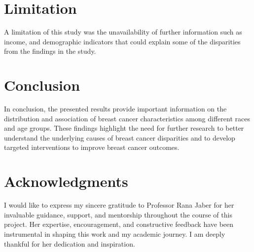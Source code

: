 \documentclass[times,sort&compress,3p]{elsarticle}
\theoremstyle{plain}
\theoremstyle{definition}
\begin{document}
\section{Limitation}

A limitation of this study was the unavailability of further information such as income, and demographic indicators that could explain some of the disparities from the findings in the study.

\section{Conclusion}
 
In conclusion, the presented results provide important information on the distribution and association of breast cancer characteristics among different races and age groups. These findings highlight the need for further research to better understand the underlying causes of breast cancer disparities and to develop targeted interventions to improve breast cancer outcomes.





\section*{Acknowledgments}

I would like to express my sincere gratitude to Professor Rana Jaber for her invaluable guidance, support, and mentorship throughout the course of this project. Her expertise, encouragement, and constructive feedback have been instrumental in shaping this work and my academic journey. I am deeply thankful for her dedication and inspiration.





\end{document}
